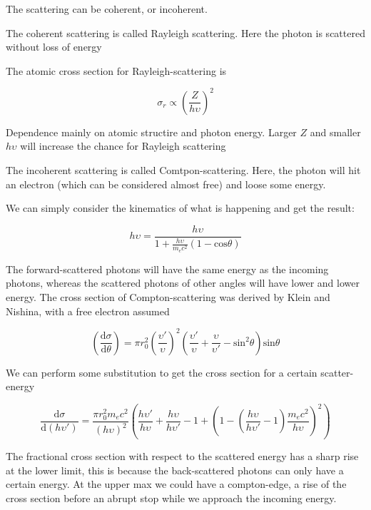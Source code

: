 \documentclass{article}
\begin{document}
The scattering can be coherent, or incoherent. 

The coherent scattering is called Rayleigh scattering. Here the photon is scattered without loss of energy

The atomic cross section for Rayleigh-scattering is 

\begin{equation}
    \sigma_r \propto \left( \frac{Z}{h\upsilon} \right)^2
\end{equation}

Dependence mainly on atomic structire and photon energy. 
Larger $Z$ and smaller $h\upsilon$ will increase the chance for Rayleigh scattering

The incoherent scattering is called Comtpon-scattering.
Here, the photon will hit an electron (which can be considered almost free) and loose some energy.

We can simply consider the kinematics of what is happening and get the result:

\begin{equation}
    h\upsilon = \frac{h\upsilon}{1 + \frac{h\upsilon}{m_e c^2}(1 - \mathrm{cos} \theta)}
\end{equation}

The forward-scattered photons will have the same energy as the incoming photons, whereas the scattered photons of other angles will have lower and lower energy.
The cross section of Compton-scattering was derived by Klein and Nishina, with a free electron assumed

\begin{equation}
    \left( \frac{\mathrm{d}\sigma}{\mathrm{d}\theta} \right ) = \pi r_0^2 \left( \frac{\upsilon'}{\upsilon} \right)^2 \left( \frac{\upsilon'}{\upsilon} + \frac{\upsilon}{\upsilon'} - \mathrm{sin}^2\theta \right ) \mathrm{sin} \theta
\end{equation}

We can perform some substitution to get the cross section for a certain scatter-energy 

\begin{equation}
    \frac{\mathrm{d}\sigma}{\mathrm{d} ( h\upsilon')} = \frac{\pi r_0^2 m_e c^2}{(h \upsilon)^2} \left ( \frac{h\upsilon'}{h\upsilon} + \frac{h\upsilon}{h\upsilon'} -1 + \left ( 1  - \left( \frac{h\upsilon}{h\upsilon'} -1 \right ) \frac{m_e c^2}{h\upsilon} \right ) ^2 \right )
\end{equation}

The fractional cross section with respect to the scattered energy has a sharp rise at the lower limit, this is because the back-scattered photons can only have a certain energy.
At the upper max we could have a compton-edge, a rise of the cross section before an abrupt stop while we approach the incoming energy.
\end{document}
